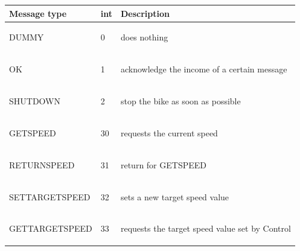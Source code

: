 \documentclass[]{scrreprt}
\begin{document}
	\begin{table}[H]
		\centering
		
		\begin{tabular}{|l|l|l|}
			\hline 
			Message type & \textbf{int} & Description \\ 
			\hline 
			DUMMY & 0 & 
			\begin{pbox}{7.0cm}{\vspace{.2\baselineskip}
					does nothing
					\vspace{.3\baselineskip}}
			\end{pbox}\\
			\hline 
			OK & 1 & 
			\begin{pbox}{7.0cm}{\vspace{.2\baselineskip}
					acknowledge the income of a certain message
					\vspace{.3\baselineskip}}
			\end{pbox}\\
			\hline 
			SHUTDOWN & 2 & 
			\begin{pbox}{7.0cm}{\vspace{.2\baselineskip}
					stop the bike as soon as possible
					\vspace{.3\baselineskip}}
			\end{pbox}\\
			\hline 
			GETSPEED & 30 & 
			\begin{pbox}{7.0cm}{\vspace{.2\baselineskip}
					requests the current speed
					\vspace{.3\baselineskip}}
			\end{pbox}\\
			\hline 
			RETURNSPEED & 31 & 
			\begin{pbox}{7.0cm}{\vspace{.2\baselineskip}
					return for GETSPEED
					\vspace{.3\baselineskip}}
			\end{pbox}\\
			\hline 
			SETTARGETSPEED & 32 & 
			\begin{pbox}{7.0cm}{\vspace{.2\baselineskip}
					sets a new target speed value
					\vspace{.3\baselineskip}}
			\end{pbox}\\
			\hline 
			GETTARGETSPEED & 33 & 
			\begin{pbox}{7.0cm}{\vspace{.2\baselineskip}
					requests the target speed value set by Control
					\vspace{.3\baselineskip}}

\end{pbox}
\end{tabular}
\end{table}
\end{document}
